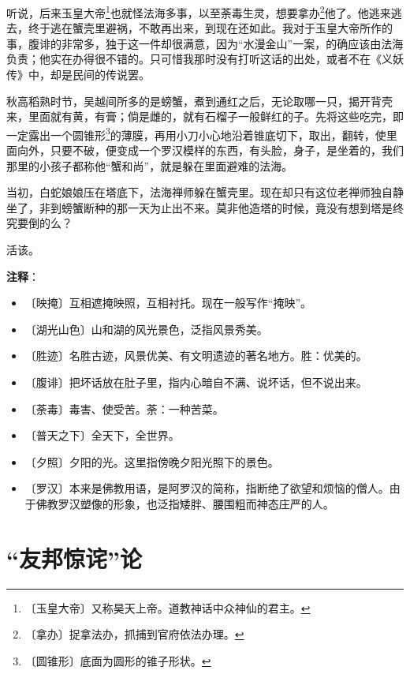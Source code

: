 \documentclass[12pt,UTF-8,openany]{ctexbook}
\begin{document}
\begin{normalsize}
    听说，后来玉皇大帝\footnote{〔玉皇大帝〕又称昊天上帝。道教神话中众神仙的君主。}也就怪法海多事，以至荼毒生灵，想要拿办\footnote{〔拿办〕捉拿法办，抓捕到官府依法办理。}他了。他逃来逃去，终于逃在蟹壳里避祸，不敢再出来，到现在还如此。我对于玉皇大帝所作的事，腹诽的非常多，独于这一件却很满意，因为“水漫金山”一案，的确应该由法海负责；他实在办得很不错的。只可惜我那时没有打听这话的出处，或者不在《义妖传》中，却是民间的传说罢。
    
    秋高稻熟时节，吴越间所多的是螃蟹，煮到通红之后，无论取哪一只，揭开背壳来，里面就有黄，有膏；倘是雌的，就有石榴子一般鲜红的子。先将这些吃完，即一定露出一个圆锥形\footnote{〔圆锥形〕底面为圆形的锥子形状。}的薄膜，再用小刀小心地沿着锥底切下，取出，翻转，使里面向外，只要不破，便变成一个罗汉模样的东西，有头脸，身子，是坐着的，我们那里的小孩子都称他“蟹和尚”，就是躲在里面避难的法海。
    
    当初，白蛇娘娘压在塔底下，法海禅师躲在蟹壳里。现在却只有这位老禅师独自静坐了，非到螃蟹断种的那一天为止出不来。莫非他造塔的时候，竟没有想到塔是终究要倒的么？
    
    活该。
    
\end{normalsize}


\newpage

\textbf{注释}：

\vspace{-1em}

\begin{itemize}
    \setlength\itemsep{-0.2em}
    \item 〔映掩〕互相遮掩映照，互相衬托。现在一般写作“掩映”。
    \item 〔湖光山色〕山和湖的风光景色，泛指风景秀美。
    \item 〔胜迹〕名胜古迹，风景优美、有文明遗迹的著名地方。胜：优美的。
    \item 〔腹诽〕把坏话放在肚子里，指内心暗自不满、说坏话，但不说出来。
    \item 〔荼毒〕毒害、使受苦。荼：一种苦菜。
    \item 〔普天之下〕全天下，全世界。
    \item 〔夕照〕夕阳的光。这里指傍晚夕阳光照下的景色。
    \item 〔罗汉〕本来是佛教用语，是阿罗汉的简称，指断绝了欲望和烦恼的僧人。由于佛教罗汉塑像的形象，也泛指矮胖、腰围粗而神态庄严的人。
\end{itemize}

\chapter{“友邦惊诧”论}
\end{document}

